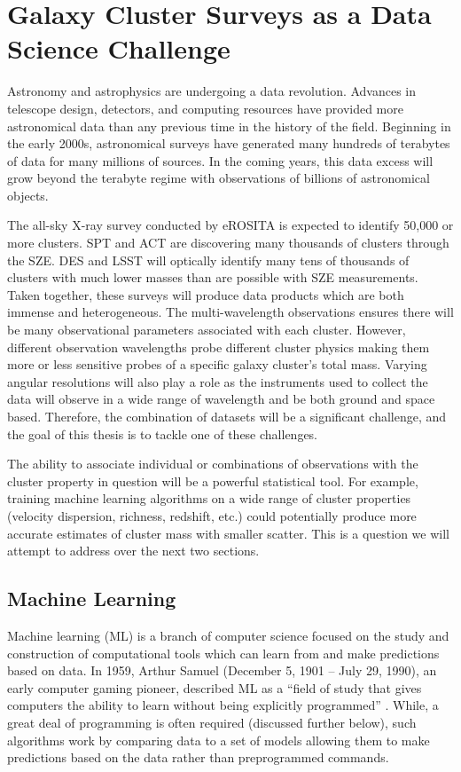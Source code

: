 \section{Galaxy Cluster Surveys as a Data Science Challenge}
Astronomy and astrophysics are undergoing a data revolution. Advances in telescope design, detectors, and computing resources have provided more astronomical data than any previous time in the history of the field. Beginning in the early 2000s, astronomical surveys have generated many hundreds of terabytes of data for many millions of sources. In the coming years, this data excess will grow beyond the terabyte regime with observations of billions of astronomical objects. 

The all-sky X-ray survey conducted by eROSITA is expected to identify 50,000 or more clusters. SPT and ACT are discovering many thousands of clusters through the SZE. DES and LSST will optically identify many tens of thousands of clusters with much lower masses than are possible with SZE measurements. Taken together, these surveys will produce data products which are both immense and heterogeneous. The multi-wavelength observations ensures there will be many observational parameters associated with each cluster. However, different observation wavelengths probe different cluster physics making them more or less sensitive probes of a specific galaxy cluster's total mass. Varying angular resolutions will also play a role as the instruments used to collect the data will observe in a wide range of wavelength and be both ground and space based. Therefore, the combination of datasets will be a significant challenge, and the goal of this thesis is to tackle one of these challenges.

The ability to associate individual or combinations of observations with the cluster property in question will be a powerful statistical tool. For example, training machine learning algorithms on a wide range of cluster properties (velocity dispersion, richness, redshift, etc.) could potentially produce more accurate estimates of cluster mass with smaller scatter. This is a question we will attempt to address over the next two sections. 

\subsection{Machine Learning}
Machine learning (ML) is a branch of computer science focused on the study and construction of computational tools which can learn from and make predictions based on data. In 1959, Arthur Samuel (December 5, 1901 -- July 29, 1990), an early computer gaming pioneer, described ML as a ``field of study that gives computers the ability to learn without being explicitly programmed'' \citep{simon2013}. While, a great deal of programming is often required (discussed further below), such algorithms work by comparing data to a set of models allowing them to make predictions based on the data rather than preprogrammed commands.

